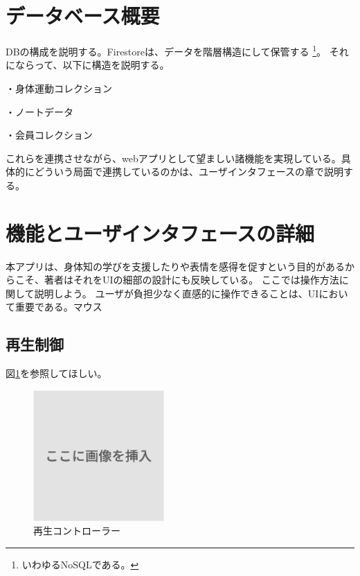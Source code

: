 \section{データベース概要}
DBの構成を説明する。Firestoreは、データを階層構造にして保管する
\footnote{いわゆるNoSQLである。}。
それにならって、以下に構造を説明する。

・身体運動コレクション


・ノートデータ


・会員コレクション

これらを連携させながら、webアプリとして望ましい諸機能を実現している。具体的にどういう局面で連携しているのかは、ユーザインタフェースの章で説明する。


\section{機能とユーザインタフェースの詳細}
本アプリは、身体知の学びを支援したりや表情を感得を促すという目的があるからこそ、著者はそれをUIの細部の設計にも反映している。
ここでは操作方法に関して説明しよう。
ユーザが負担少なく直感的に操作できることは、UIにおいて重要である。マウス
\subsection{再生制御}

図\ref{fig:再生コントローラー}を参照してほしい。
\begin{figure}[h]
  \centering
  \includegraphics[width=5cm]{images/dummy.png}
  \caption{再生コントローラー}
  \label{fig:再生コントローラー}
\end{figure}


